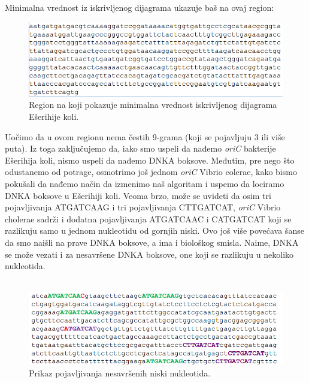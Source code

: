 Minimalna vrednost iz iskrivljenog dijagrama ukazuje baš na ovaj region:

\begin{figure}[H]
\caption{Region na koji pokazuje minimalna vrednost iskrivljenog dijagrama Ešerihije koli.}
\centering
\includegraphics[width=1\textwidth]{poglavlja/1/slike/ecoli_region.png}
\end{figure} 

Uočimo da u ovom regionu nema čestih 9-grama (koji se pojavljuju 3 ili više puta). Iz toga zaključujemo da, iako smo uspeli da nađemo \textit{oriC} bakterije Ešerihija koli, nismo uspeli da nađemo DNKA boksove. Međutim, pre nego što odustanemo od potrage, osmotrimo još jednom \textit{oriC} Vibrio colerae, kako bismo pokušali da nađemo način da izmenimo naš algoritam i uspemo da lociramo DNKA boksove u Ešerihiji koli. Veoma brzo, može se uvideti da osim tri pojavljivanja ATGATCAAG i tri pojavljivanja CTTGATCAT, \textit{oriC} Vibrio cholerae sadrži i dodatna pojavljivanja ATGATCAAC i CATGATCAT koji se razlikuju samo u jednom nukleotidu od gornjih niski. Ovo još više povećava šanse da smo naišli na prave DNKA boksove, a ima i biološkog smisla. Naime, DNKA se može vezati i za nesavršene DNKA boksove, one koji se razlikuju u nekoliko nukleotida.\\\\


\begin{figure}[H]
\caption{Prikaz pojavljivanja nesavršenih niski nukleotida.}
\centering
\includegraphics[width=1\textwidth]{poglavlja/1/slike/nesavrseni1.png}
\end{figure} 

